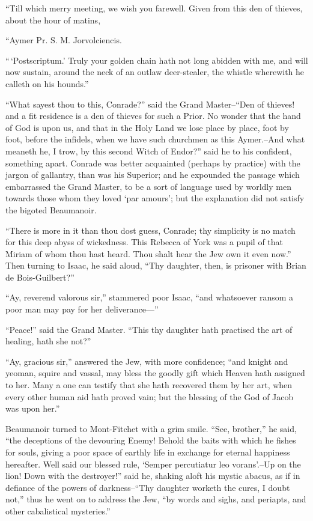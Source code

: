 ``Till which merry meeting, we wish you farewell. Given from this den of
thieves, about the hour of matins,

``Aymer Pr. S. M. Jorvolciencis.

``\,`Postscriptum.' Truly your golden chain hath not long abidden with
me, and will now sustain, around the neck of an outlaw deer-stealer, the
whistle wherewith he calleth on his hounds.''

``What sayest thou to this, Conrade?'' said the Grand Master--``Den of
thieves! and a fit residence is a den of thieves for such a Prior. No
wonder that the hand of God is upon us, and that in the Holy Land we
lose place by place, foot by foot, before the infidels, when we have
such churchmen as this Aymer.--And what meaneth he, I trow, by this
second Witch of Endor?'' said he to his confident, something apart.
Conrade was better acquainted (perhaps by practice) with the jargon of
gallantry, than was his Superior; and he expounded the passage which
embarrassed the Grand Master, to be a sort of language used by worldly
men towards those whom they loved `par amours'; but the explanation did
not satisfy the bigoted Beaumanoir.

``There is more in it than thou dost guess, Conrade; thy simplicity is
no match for this deep abyss of wickedness. This Rebecca of York was a
pupil of that Miriam of whom thou hast heard. Thou shalt hear the Jew
own it even now.'' Then turning to Isaac, he said aloud, ``Thy daughter,
then, is prisoner with Brian de Bois-Guilbert?''

``Ay, reverend valorous sir,'' stammered poor Isaac, ``and whatsoever
ransom a poor man may pay for her deliverance---''

``Peace!'' said the Grand Master. ``This thy daughter hath practised the
art of healing, hath she not?''

``Ay, gracious sir,'' answered the Jew, with more confidence; ``and
knight and yeoman, squire and vassal, may bless the goodly gift which
Heaven hath assigned to her. Many a one can testify that she hath
recovered them by her art, when every other human aid hath proved vain;
but the blessing of the God of Jacob was upon her.''

Beaumanoir turned to Mont-Fitchet with a grim smile. ``See, brother,''
he said, ``the deceptions of the devouring Enemy! Behold the baits with
which he fishes for souls, giving a poor space of earthly life in
exchange for eternal happiness hereafter. Well said our blessed rule,
`Semper percutiatur leo vorans'.--Up on the lion! Down with the
destroyer!'' said he, shaking aloft his mystic abacus, as if in defiance
of the powers of darkness--``Thy daughter worketh the cures, I doubt
not,'' thus he went on to address the Jew, ``by words and sighs, and
periapts, and other cabalistical mysteries.''

